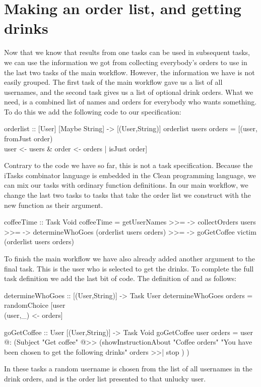 \documentclass[a4paper,11pt]{article}
\begin{document}
\section{Making an order list, and getting drinks}
Now that we know that results from one tasks can be used in subsequent tasks, we can use the information we got from collecting everybody's orders to use in the last two tasks of the main workflow. However, the information we have is not easily grouped. The first task of the main workflow gave us a list of all usernames, and the second task gives us a list of optional drink orders. What we need, is a combined list of names and orders for everybody who wants something. To do this we add the following code to our specification:
\begin{CleanCode}
orderlist :: [User] [Maybe String] -> [(User,String)]
orderlist users orders
 = [(user, fromJust order) \\ user <- users & order <- orders | isJust order]
\end{CleanCode}
Contrary to the code we have so far, this is not a task specification. Because the iTasks combinator language is embedded in the Clean programming language, we can mix our tasks with ordinary function definitions. In our main workflow, we change the last two tasks to tasks that take the order list we construct with the new function as their argument.
\begin{CleanCode}
coffeeTime :: Task Void
coffeeTime
	=   getUserNames
	>>= \users ->  collectOrders users
	>>= \orders -> determineWhoGoes (orderlist users orders)
	>>= \victim -> goGetCoffee victim (orderlist users orders)
\end{CleanCode}

To finish the main workflow we have also already added another argument to the final task. This is the user who is selected to get the drinks.
To complete the full task definition we add the last bit of code. The definition of  and  as follows:
\begin{CleanCode}
determineWhoGoes :: [(User,String)] -> Task User
determineWhoGoes orders = randomChoice [user \\ (user,_) <- orders]

goGetCoffee :: User [(User,String)] -> Task Void
goGetCoffee user orders
	= user @:
	(Subject "Get coffee" @>> 
		(showInstructionAbout 
			"Coffee orders"
			"You have been chosen to get the following drinks"
			orders
			>>| stop
		)                        
	)
\end{CleanCode}
In these tasks a random username is chosen from the list of all usernames in the drink orders, and is the order list presented to that unlucky user.
\end{document}
